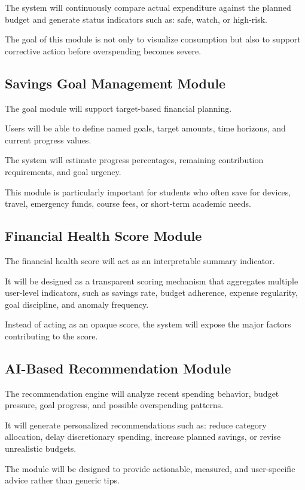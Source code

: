 \documentclass[12pt,a4paper]{report}
\begin{document}
The system will continuously compare actual expenditure against the planned budget and generate status indicators such as:
safe,
watch,
or high-risk.

The goal of this module is not only to visualize consumption but also to support corrective action before overspending becomes severe.

\subsection{Savings Goal Management Module}
The goal module will support target-based financial planning.

Users will be able to define named goals,
target amounts,
time horizons,
and current progress values.

The system will estimate progress percentages,
remaining contribution requirements,
and goal urgency.

This module is particularly important for students who often save for devices,
travel,
emergency funds,
course fees,
or short-term academic needs.

\subsection{Financial Health Score Module}
The financial health score will act as an interpretable summary indicator.

It will be designed as a transparent scoring mechanism that aggregates multiple user-level indicators,
such as savings rate,
budget adherence,
expense regularity,
goal discipline,
and anomaly frequency.

Instead of acting as an opaque score,
the system will expose the major factors contributing to the score.

\subsection{AI-Based Recommendation Module}
The recommendation engine will analyze recent spending behavior,
budget pressure,
goal progress,
and possible overspending patterns.

It will generate personalized recommendations such as:
reduce category allocation,
delay discretionary spending,
increase planned savings,
or revise unrealistic budgets.

The module will be designed to provide actionable,
measured,
and user-specific advice rather than generic tips.
\end{document}
